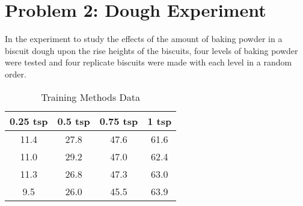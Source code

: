 \documentclass{article}
\begin{document}
\section*{Problem 2: Dough Experiment}
In the experiment to study the effects of the amount of baking powder in a biscuit dough upon the rise heights of the biscuits, four
levels of baking powder were tested and four replicate biscuits  were made with each level in a random order.
\begin{table}[!ht]
	\centering
	\caption{Training Methods Data}
	\begin{tabular}{c c c c}
		\hline
		\textbf{0.25 tsp} & \textbf{0.5 tsp} & \textbf{0.75 tsp} & \textbf{1 tsp} \\
		\hline
		11.4              & 27.8             & 47.6              & 61.6           \\
		11.0              & 29.2             & 47.0              & 62.4           \\
		11.3              & 26.8             & 47.3              & 63.0           \\
		9.5               & 26.0             & 45.5              & 63.9           \\
		\hline
	\end{tabular}
\end{table}
\end{document}
